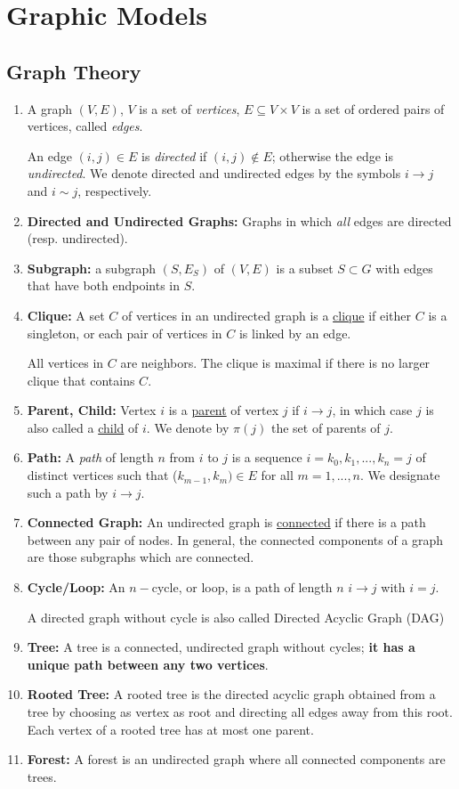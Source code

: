 \documentclass[11pt,a4paper]{article}
\begin{document}
\section{Graphic Models}
\subsection{Graph Theory}
\begin{enumerate}
    \item A graph $(V,E)$, $V$ is a set of \textit{vertices}, $E\subseteq V\times V$ is a set of ordered pairs of vertices, called \textit{edges}.
    
    An edge $(i,j)\in E$ is \textit{directed} if $(i,j)\notin E$; otherwise the edge is \textit{undirected}. We denote directed and undirected edges by the symbols $i \rightarrow j$ and $i\sim j$, respectively.
    \item \textbf{Directed and Undirected Graphs:} Graphs in which \textit{all} edges are directed (resp. undirected).
    \item \textbf{Subgraph:} a subgraph $(S,E_S)$ of $(V,E)$ is a subset $S\subset G$ with edges that have both endpoints in $S$.
    \item \textbf{Clique:} A set $C$ of vertices in an undirected graph is a \underline{clique} if either $C$ is a singleton, or each pair of vertices in $C$ is linked by an edge.
    
    All vertices in $C$ are neighbors. The clique is maximal if there is no larger clique that contains $C$.
    \item \textbf{Parent, Child:} Vertex $i$ is a \underline{parent} of vertex $j$ if $i \rightarrow j$, in which case $j$ is also called a \underline{child} of $i$. We denote by $\pi(j)$ the set of parents of $j$.
    \item \textbf{Path:} A \textit{path} of length $n$ from $i$ to $j$ is a sequence $i = k_0,k_1,...,k_n = j$ of distinct vertices such that ($k_{m-1},k_m) \in E$ for all $m = 1,... ,n$. We designate such a path by $i \rightarrow j$.
    \item \textbf{Connected Graph:} An undirected graph is \underline{connected} if there is a path between any pair of nodes. In general, the connected components of a graph are those subgraphs which are connected.
    \item \textbf{Cycle/Loop:} An $n-$cycle, or loop, is a path of length $n$ $i \rightarrow j$ with $i = j$.
    
    A directed graph without cycle is also called Directed Acyclic Graph (DAG)
    \item \textbf{Tree:} A tree is a connected, undirected graph without cycles; \textbf{it has a unique path between any two vertices}.
    \item \textbf{Rooted Tree:} A rooted tree is the directed acyclic graph obtained from a tree by choosing as vertex as root and directing all edges away from this root. Each vertex of a rooted tree has at most one parent.
    \item \textbf{Forest:} A forest is an undirected graph where all connected components are trees.
\end{enumerate}
\end{document}
